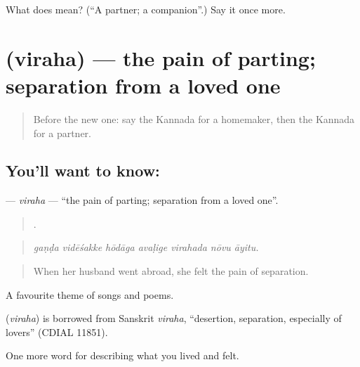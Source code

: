 \begin{tcolorbox}[breakable,colback=teal!4,colframe=teal!35!black,title={Before you move on}]
What does  mean? (\textquotedblleft{}A partner; a companion\textquotedblright{}.) Say it once more.
\end{tcolorbox}
\section[\texorpdfstring{\kn{ವಿರಹ} (viraha)}{ವಿರಹ (viraha)}]{ (viraha) — the pain of parting; separation from a loved one}

\label{lesson:KA-C523-viraha}



\begin{quote}
Before the new one: say the Kannada for a homemaker, then the Kannada for a partner.
\end{quote}

\subsection*{You'll want to know: }
\textbf{} — \emph{viraha} — \textquotedblleft{}the pain of parting; separation from a loved one\textquotedblright{}.

\begin{quote}
      .
\end{quote}

\begin{quote}
\emph{gaṇḍa vidēśakke hōdāga avaḷige virahada nōvu āyitu.}
\end{quote}

\begin{quote}
When her husband went abroad, she felt the pain of separation.
\end{quote}

A favourite theme of songs and poems.

\begin{cousinweb}
\textbf{} (\emph{viraha}) is borrowed from Sanskrit \emph{viraha}, \textquotedblleft{}desertion, separation, especially of lovers\textquotedblright{} (CDIAL 11851).
\end{cousinweb}

\begin{grammarlens}[title={What you've built}]
One more word for describing what you lived and felt.
\end{grammarlens}

